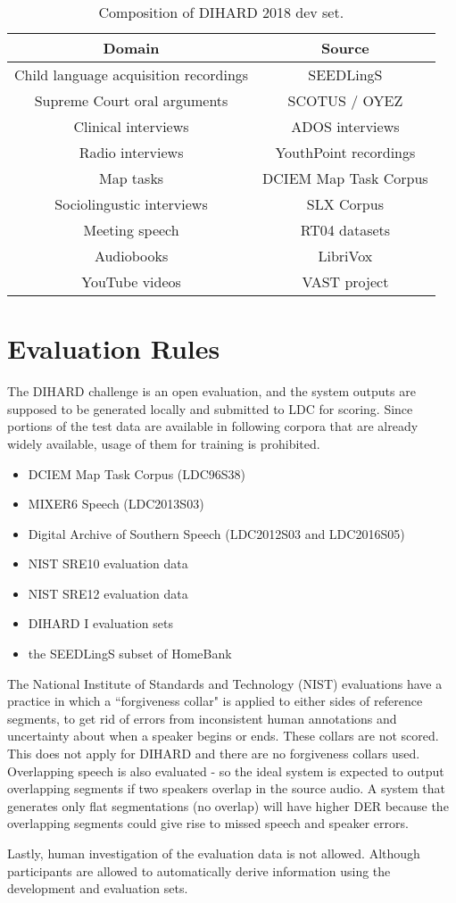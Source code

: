 \begin{table}[h]
	\centering
	\begin{tabular}{|c|c|}
		\hline
		Domain & Source \\
		\hline
		Child language acquisition recordings & SEEDLingS \\
		Supreme Court oral arguments & SCOTUS / OYEZ \\
		Clinical interviews & ADOS interviews \\
		Radio interviews & YouthPoint recordings \\
		Map tasks & DCIEM Map Task Corpus \\
		Sociolingustic interviews & SLX Corpus \\
		Meeting speech & RT04 datasets \\
		Audiobooks & LibriVox \\
		YouTube videos & VAST project \\
		\hline
	\end{tabular}
	\caption{Composition of DIHARD 2018 dev set.}
	\label{table-dihard-dev-composition}
\end{table}

\section{Evaluation Rules}
The DIHARD challenge is an open evaluation, and the system outputs are supposed to be generated locally and submitted to LDC for scoring. Since portions of the test data are available in following corpora that are already widely available, usage of them for training is prohibited.

\begin{itemize}
	\item DCIEM Map Task Corpus (LDC96S38)
	\item MIXER6 Speech (LDC2013S03)
	\item Digital Archive of Southern Speech (LDC2012S03 and LDC2016S05)
	\item NIST SRE10 evaluation data
	\item NIST SRE12 evaluation data
	\item DIHARD I evaluation sets
	\item the SEEDLingS subset of HomeBank
\end{itemize}

The National Institute of Standards and Technology (NIST) evaluations have a practice in which a ``forgiveness collar" is applied to either sides of reference segments, to get rid of errors from inconsistent human annotations and uncertainty about when a speaker begins or ends. These collars are not scored. This does not apply for DIHARD and there are no forgiveness collars used. Overlapping speech is also evaluated - so the ideal system is expected to output overlapping segments if two speakers overlap in the source audio. A system that generates only flat segmentations (no overlap) will have higher DER because the overlapping segments could give rise to missed speech and speaker errors.

Lastly, human investigation of the evaluation data is not allowed. Although participants are allowed to automatically derive information using the development and evaluation sets.
